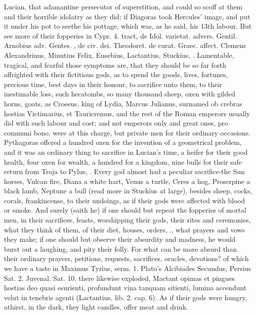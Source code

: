 {Lucian, that adamantine persecutor of superstition, and \Pliny{}
could so scoff at them and their horrible idolatry as they did; if
Diagoras took Hercules' image, and put it under his pot to seethe his
pottage, which was, as he said, his 13th labour. But see more of their
fopperies in Cypr. 4. tract, de Idol. varietat. \Chrysostom{} advers.
Gentil. Arnobius adv. Gentes. \Austin{}, de civ. dei. Theodoret. de curat.
Graec. affect. Clemens Alexandrinus, Minutius Felix, Eusebius,
Lactantius, Stuckius, \etc{}. Lamentable, tragical, and fearful those
symptoms are, that they should be so far forth affrighted with their
fictitious gods, as to spend the goods, lives, fortunes, precious time,
best days in their honour, to sacrifice unto them, to their
inestimable loss, such hecatombs, so many thousand sheep, oxen with
gilded horns, goats, as Croesus, king of Lydia,  Marcus
Julianus, surnamed ob crebras hostias Victimarius, et Tauricremus, and
the rest of the Roman emperors usually did with such labour and cost;
and not emperors only and great ones, pro communi bono, were at this
charge, but private men for their ordinary occasions. Pythagoras
offered a hundred oxen for the invention of a geometrical problem, and
it was an ordinary thing to sacrifice in Lucian's time, a heifer
for their good health, four oxen for wealth, a hundred for a kingdom,
nine bulls for their safe return from Troja to Pylus, \etc{}. Every god
almost had a peculiar sacrifice-the Sun horses, Vulcan fire, Diana a
white hart, Venus a turtle, Ceres a hog, Proserpine a black lamb,
Neptune a bull (read more in  Stuckius at large), besides sheep,
cocks, corals, frankincense, to their undoings, as if their gods were
affected with blood or smoke. And surely (saith he) if one should
but repeat the fopperies of mortal men, in their sacrifices, feasts,
worshipping their gods, their rites and ceremonies, what they think of
them, of their diet, houses, orders, \etc{}., what prayers and vows they
make; if one should but observe their absurdity and madness, he would
burst out a laughing, and pity their folly. For what can be more absurd
than their ordinary prayers, petitions, requests, sacrifices,
oracles, devotions? of which we have a taste in Maximus Tyrius, serm.
1. Plato's Alcibiades Secundus, Persius Sat. 2. Juvenal. Sat. 10. there
likewise exploded, Mactant opimas et pingues hostias deo quasi
esurienti, profundunt vina tanquam sitienti, lumina accendunt velut in
tenebris agenti (Lactantius, lib. 2. cap. 6). As if their gods were
hungry, athirst, in the dark, they light candles, offer meat and drink.

}
